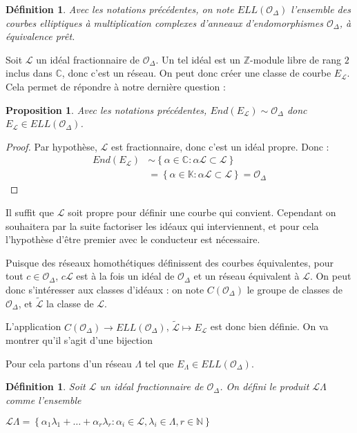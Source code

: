 \documentclass{article}
\newcommand{\N}[0]{\mathbb{N}}
\newcommand{\Z}[0]{\mathbb{Z}}
\newcommand{\C}[0]{\mathbb{C}}
\newcommand{\K}[0]{\mathbb{K}}
\newcommand{\OR}[0]{\mathcal{O}}
\newcommand{\LR}[0]{\mathcal{L}}
\newcommand{\CL}[0]{\tilde{\LR}}
\newtheorem{Prop}[The]{Proposition}
\newtheorem{Def}[The]{Définition}
\begin{document}
\begin{Def}
	Avec les notations précédentes, on note $ELL(\OR_{\Delta})$ l'ensemble des courbes elliptiques à multiplication complexes d'anneaux d'endomorphismes $\OR_{\Delta}$, à équivalence prêt. 
\end{Def}


Soit $\LR$ un idéal fractionnaire de $\OR_{\Delta}$. Un tel idéal est un $\Z$-module libre de rang $2$ inclus dans $\C$, donc c'est un réseau. On peut donc créer une classe de courbe $E_{\LR}$. Cela permet de répondre à notre dernière question :

\begin{Prop}
	Avec les notations précédentes, $End(E_{\LR})\sim\OR_{\Delta}$ donc $E_{\LR}\in ELL(\OR_{\Delta})$.
\end{Prop}

\begin{proof}
	Par hypothèse, $\LR$ est fractionnaire, donc c'est un idéal propre. Donc :
	\begin{align*}
		End(E_{\LR})&\sim\left\lbrace\alpha\in\C : \alpha\LR\subset\LR\right\rbrace\\
		&= \left\lbrace\alpha\in\K : \alpha\LR\subset\LR\right\rbrace = \OR_{\Delta}
	\end{align*}
	
\end{proof}

Il suffit que $\LR$ soit propre pour définir une courbe qui convient. Cependant on souhaitera par la suite factoriser les idéaux qui interviennent, et pour cela l'hypothèse d'être premier avec le conducteur est nécessaire.

Puisque des réseaux homothétiques définissent des courbes équivalentes, pour tout $c\in\OR_{\Delta}$, $c\LR$ est à la fois un idéal de $\OR_{\Delta}$ et un réseau équivalent à $\LR$. On peut donc s'intéresser aux classes d'idéaux : on note $C(\OR_{\Delta})$ le groupe de classes de $\OR_{\Delta}$, et $\CL$ la classe de $\LR$. 

L'application $C(\OR_{\Delta})\rightarrow ELL(\OR_{\Delta})$, $\CL\mapsto E_{\LR}$ est donc bien définie. On va montrer qu'il s'agit d'une bijection

Pour cela partons d'un réseau $\Lambda$ tel que $E_{\Lambda}\in ELL(\OR_{\Delta})$. 

\begin{Def}
	Soit $\LR$ un idéal fractionnaire de $\OR_{\Delta}$. On défini le produit $\LR\Lambda$ comme l'ensemble 
	
	$\LR\Lambda = \left\lbrace \alpha_1\lambda_1 + \ldots + \alpha_r\lambda_r : \alpha_i\in\LR , \lambda_i\in\Lambda , r\in\N\right\rbrace$ 
\end{Def}
	
\end{document}
